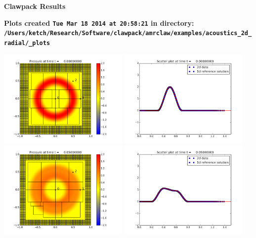 \documentclass[11pt]{article}
\begin{document}
        \begin{center}{\Large\bf Clawpack Results}\vskip 5pt
        
        \bf Plots created {\tt Tue Mar 18 2014 at 20:58:21} in directory: \vskip 5pt
        \verb+/Users/ketch/Research/Software/clawpack/amrclaw/examples/acoustics_2d_radial/_plots+
        \end{center}
        \vskip 5pt
        \includegraphics[width=0.475\textwidth]{frame0000fig0.png}
\includegraphics[width=0.475\textwidth]{frame0000fig3.png}
\vskip 10pt 
\includegraphics[width=0.475\textwidth]{frame0001fig0.png}
\includegraphics[width=0.475\textwidth]{frame0001fig3.png}
\end{document}

